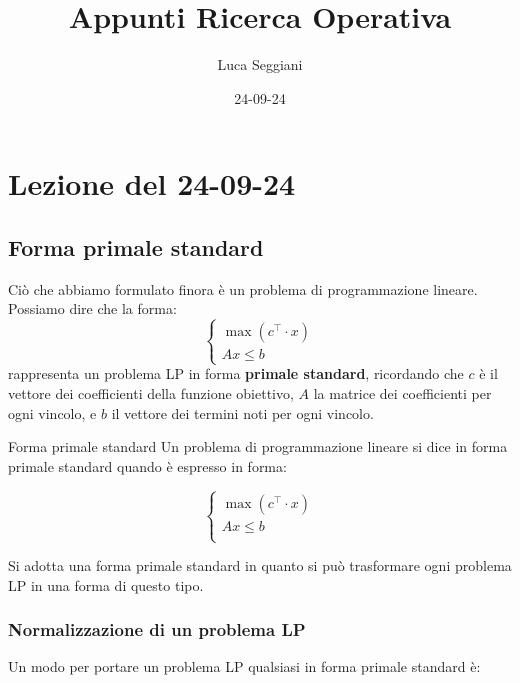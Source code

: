 \documentclass[a4paper,11pt]{article}
\title{Appunti Ricerca Operativa}
\author{Luca Seggiani}
\date{24-09-24}
\begin{document}
\section{Lezione del 24-09-24}

\thispagestyle{empty}
\pagestyle{fancy}


\subsection{Forma primale standard}
Ciò che abbiamo formulato finora è un problema di programmazione lineare.
Possiamo dire che la forma:
\[
	\begin{cases}
			\max(c^\intercal \cdot x) \\
			A x \leq b
	\end{cases}
\]
rappresenta un problema LP in forma \textbf{primale standard}, ricordando che $c$ è il vettore dei coefficienti della funzione obiettivo, $A$ la matrice dei coefficienti per ogni vincolo, e $b$ il vettore dei termini noti per ogni vincolo.

\begin{definition}{Forma primale standard}
	Un problema di programmazione lineare si dice in forma primale standard quando è espresso in forma:
	
	\[
		\begin{cases}
			\max(c^\intercal \cdot x) \\
			Ax \leq b \\
		\end{cases}
	\]

\end{definition}
\par\smallskip
Si adotta una forma primale standard in quanto si può trasformare ogni problema LP in una forma di questo tipo.

\subsubsection{Normalizzazione di un problema LP}
Un modo per portare un problema LP qualsiasi in forma primale standard è:
\end{document}
